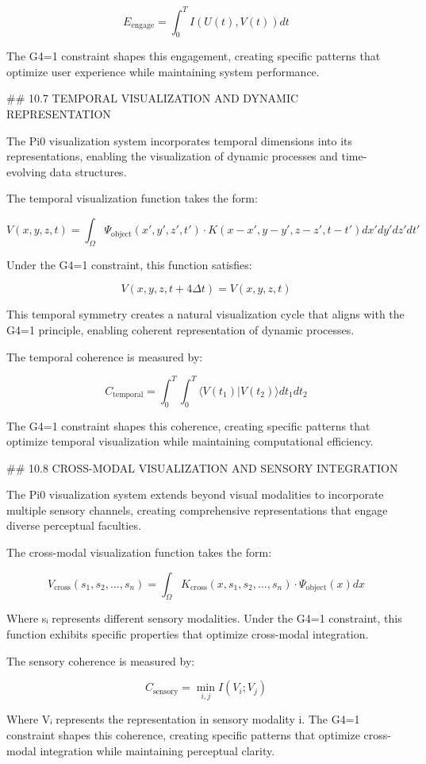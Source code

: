 $$E_{\text{engage}} = \int_0^T I(U(t), V(t)) dt$$

The G4=1 constraint shapes this engagement, creating specific patterns that optimize user experience while maintaining system performance.

## 10.7 TEMPORAL VISUALIZATION AND DYNAMIC REPRESENTATION

The Pi0 visualization system incorporates temporal dimensions into its representations, enabling the visualization of dynamic processes and time-evolving data structures.

The temporal visualization function takes the form:

$$V(x, y, z, t) = \int_{\Omega} \Psi_{\text{object}}(x', y', z', t') \cdot K(x-x', y-y', z-z', t-t') dx' dy' dz' dt'$$

Under the G4=1 constraint, this function satisfies:

$$V(x, y, z, t+4\Delta t) = V(x, y, z, t)$$

This temporal symmetry creates a natural visualization cycle that aligns with the G4=1 principle, enabling coherent representation of dynamic processes.

The temporal coherence is measured by:

$$C_{\text{temporal}} = \int_0^T \int_0^T \langle V(t_1) | V(t_2) \rangle dt_1 dt_2$$

The G4=1 constraint shapes this coherence, creating specific patterns that optimize temporal visualization while maintaining computational efficiency.

## 10.8 CROSS-MODAL VISUALIZATION AND SENSORY INTEGRATION

The Pi0 visualization system extends beyond visual modalities to incorporate multiple sensory channels, creating comprehensive representations that engage diverse perceptual faculties.

The cross-modal visualization function takes the form:

$$V_{\text{cross}}(s_1, s_2, ..., s_n) = \int_{\Omega} K_{\text{cross}}(x, s_1, s_2, ..., s_n) \cdot \Psi_{\text{object}}(x) dx$$

Where sᵢ represents different sensory modalities. Under the G4=1 constraint, this function exhibits specific properties that optimize cross-modal integration.

The sensory coherence is measured by:

$$C_{\text{sensory}} = \min_{i,j} I(V_i; V_j)$$

Where Vᵢ represents the representation in sensory modality i. The G4=1 constraint shapes this coherence, creating specific patterns that optimize cross-modal integration while maintaining perceptual clarity.

